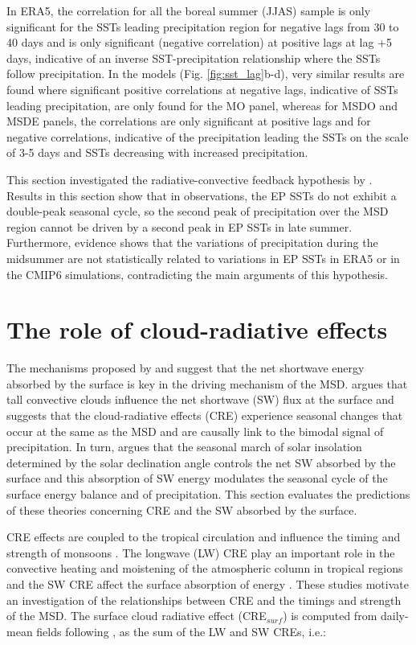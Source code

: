 In ERA5, the correlation for all the boreal summer (JJAS) sample is only significant for the SSTs leading  precipitation region for negative lags from 30 to 40 days and is only significant (negative correlation) at positive lags at lag +5 days, indicative of an inverse SST-precipitation relationship where the SSTs follow precipitation. 
In the models (Fig. \ref{fig:sst_lag}b-d), very similar results are found where significant positive correlations at negative lags, indicative of SSTs leading precipitation, are only found for the MO panel, whereas for MSDO and MSDE panels, the correlations are only significant at positive lags and for negative correlations, indicative of the precipitation leading the SSTs on the scale of 3-5 days and SSTs decreasing with increased precipitation.

This section investigated the radiative-convective feedback hypothesis by \cite{magana1999}.
Results in this section show that in observations, the EP SSTs do not exhibit a double-peak seasonal cycle, so the second peak of precipitation over the MSD region cannot be driven by a second peak in EP SSTs in late summer. Furthermore, evidence shows that the variations of precipitation during the midsummer are not statistically related to variations in EP SSTs in ERA5 or in the CMIP6 simulations, contradicting the main arguments of this hypothesis.

\section{The role of cloud-radiative effects}

The mechanisms proposed by \cite{magana1999} and \cite{karnauskas2013} suggest that the net shortwave energy absorbed by the surface is key in the driving mechanism of the MSD. \cite{magana1999} argues that tall convective clouds influence the net shortwave (SW) flux at the surface and suggests that the cloud-radiative effects (CRE) experience seasonal changes that occur at the same as the MSD and are causally link to the bimodal signal of precipitation. 
In turn, \cite{karnauskas2013} argues that the seasonal march of solar insolation determined by the solar declination angle controls the net SW absorbed by the surface and this absorption of SW energy modulates the seasonal cycle of the surface energy balance and of precipitation.
This section evaluates the predictions of these theories concerning CRE and the SW absorbed by the surface. 

CRE effects are coupled to the tropical circulation \citep{bony2004dynamic,webb2017} and influence the timing and strength of monsoons \citep{guo2015,byrne2020}. The longwave (LW) CRE play an important role in the convective heating and moistening of the atmospheric column in tropical regions and the SW CRE affect the surface absorption of energy \citep{allan2011}. 
These studies motivate an investigation of the relationships between CRE and the timings and strength of the MSD. The surface cloud radiative effect (CRE$_{surf}$) is computed from daily-mean fields following \cite{allan2011}, as the sum of the LW and SW CREs, i.e.:

